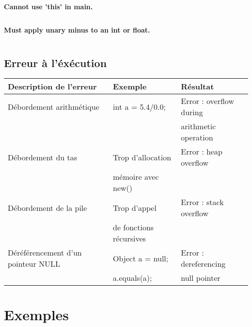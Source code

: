 \documentclass[a4,12pt]{article}
\begin{document}
\textbf{Cannot use 'this' in main.}\\

\begin{lstlisting}

\end{lstlisting}




\textbf{Must apply unary minus to an int or float.}\\

\begin{lstlisting}

\end{lstlisting}



\subsection{Erreur à l'éxécution}
\begin{tabular}{|l|l|l|}
\hline
   Description de l'erreur & Exemple & Résultat \\
   \hline
   Débordement arithmétique & int a = 5.4/0.0; & Error : overflow during \\
      &  &  arithmetic operation \\
   \hline
   Débordement du tas & Trop d'allocation & Error : heap overflow \\
    &  mémoire avec new() &  \\
   \hline
   Débordement de la pile & Trop d'appel& Error : stack overflow \\
         & de fonctions récursives &\\
   
   \hline
   Déréférencement d'un pointeur NULL & Object a = null;  & Error : dereferencing  \\
   & a.equals(a); & null pointer \\
   \hline
\end{tabular}

\section{Exemples}
\end{document}

